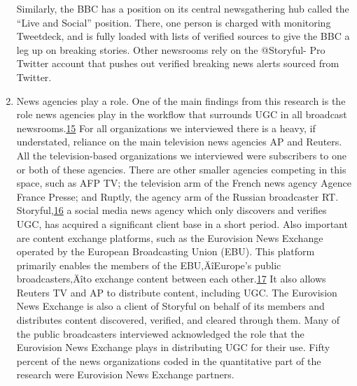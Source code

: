 \documentclass[symmetric, notoc, nobib]{towcenter-book}
\begin{document}
\begin{enumerate}
Similarly, the BBC has a position on its central newsgathering hub called
the ``Live and Social'' position. There, one person is charged with monitoring
Tweetdeck, and is fully loaded with lists of verified sources to give the
BBC a leg up on breaking stories. Other newsrooms rely on the @Storyful-
Pro Twitter account that pushes out verified breaking news alerts sourced
from Twitter.
\item News agencies play a role.
One of the main findings from this research is the role news agencies play
in the workflow that surrounds UGC in all broadcast newsrooms.{\href{#endnotes}{15}} For all
organizations we interviewed there is a heavy, if understated, reliance on
the main television news agencies AP and Reuters. All the television-based
organizations we interviewed were subscribers to one or both of these agencies.
There are other smaller agencies competing in this space, such as AFP
TV; the television arm of the French news agency Agence France Presse;
and Ruptly, the agency arm of the Russian broadcaster RT.
Storyful,{\href{#endnotes}{16}} a social media news agency which only discovers and verifies
UGC, has acquired a significant client base in a short period. Also important
are content exchange platforms, such as the Eurovision News Exchange
operated by the European Broadcasting Union (EBU). This platform primarily
enables the members of the EBU‚ÄîEurope's public broadcasters‚Äîto
exchange content between each other.{\href{#endnotes}{17}} It also allows Reuters TV and AP to
distribute content, including UGC. The Eurovision News Exchange is also
a client of Storyful on behalf of its members and distributes content discovered,
verified, and cleared through them. Many of the public broadcasters
interviewed acknowledged the role that the Eurovision News Exchange
plays in distributing UGC for their use. Fifty percent of the news organizations
coded in the quantitative part of the research were Eurovision News
Exchange partners.


\end{enumerate}
\end{document}
